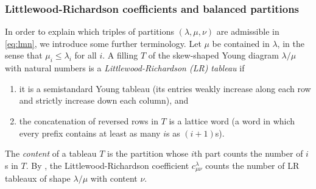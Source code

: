 \documentclass[12pt,dvipsnames,accepted=2016-08-18,a4paper,onecolumn]{quantumarticle}
\numberwithin{equation}{section}
\theoremstyle{definition}
\begin{document}
\subsubsection{Littlewood-Richardson coefficients and balanced partitions}\label{sec:LR}



In order to explain which triples of partitions $(\lambda,\mu,\nu)$ are admissible in \eqref{eq:lmn}, we introduce some further terminology. Let $\mu$ be contained in $\lambda$, in the sense that $\mu_i\le \lambda_i$ for all $i$. A filling $T$ of the skew-shaped Young diagram $\lambda/\mu$ with natural numbers is a \textit{Littlewood-Richardson (LR) tableau} if
\begin{enumerate}
    \item it is a semistandard Young tableau (its entries weakly increase along each row and strictly increase down each column), and
    \item the concatenation of reversed rows in $T$ is a lattice word (a word in which every prefix contains at least as many $i$s as $(i + 1)$s).
\end{enumerate}
The \textit{content} of a tableau $T$ is the partition whose $i$th part counts the number of $i$s in $T$. 
By \cite[Theorem 4.9.4]{Sag01}, the Littlewood-Richardson coefficient $c^\lambda_{\mu\nu}$ counts the number of LR tableaux of shape $\lambda/\mu$ with content $\nu$.
\end{document}
